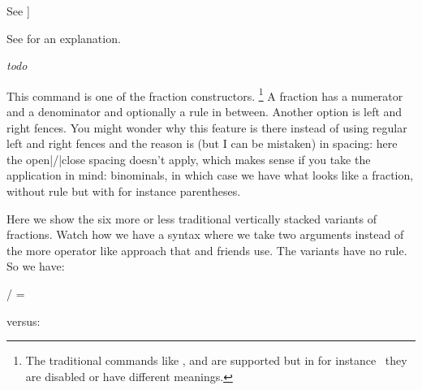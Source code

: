 \getbuffer

\stopnewprimitive

\startnewprimitive[title={\prm {Umathyscale}}]

See ]

\stopnewprimitive

\startnewprimitive[title={\prm {Umiddle}}]

See  for an explanation.

\stopnewprimitive

\startnewprimitive[title={\prm {Uoperator}}]

{\em todo} 

\stopnewprimitive

\startnewprimitive[title={\prm {Uover}}]

This command is one of the fraction constructors. \footnote {The traditional
commands like ,  and  are supported but in for
instance \CONTEXT\ they are disabled or have different meanings.} A fraction has
a numerator and a denominator and optionally a rule in between. Another option is
left and right fences. You might wonder why this feature is there instead of
using regular left and right fences and the reason is (but I can be mistaken) in
spacing: here the open|/|close spacing doesn't apply, which makes sense if you
take the application in mind: binominals, in which case we have what looks like a
fraction, without rule but with for instance parentheses.

Here we show the six more or less traditional vertically stacked variants of
fractions. Watch how we have a syntax where we take two arguments instead of the
more operator like approach that  and friends use. The 
variants have no rule. So we have:

\starttabulate[|l|lT|lT|lT|l|]
    \NC \type{\Uabove}     \NC   \NC 1pt \NC {} \NC {}
    \NC \type{\Uatop}      \NC   \NC     \NC {} \NC {}
    \NC \type{\Uover}      \NC   \NC     \NC {} \NC {}
    \NC \type{\Uskewed}    \NC / \NC     \NC {} \NC {}
    \NC \type{\Ustretched} \NC = \NC     \NC {} \NC {}
\stoptabulate

versus:

